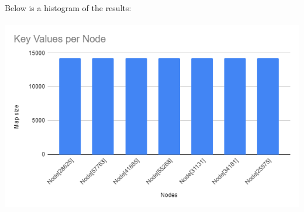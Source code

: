 \documentclass{article}
\begin{document}
Below is a histogram of the results:\\\\
\includegraphics[width=\linewidth]{img/LoadChart.png} 
\end{document}
